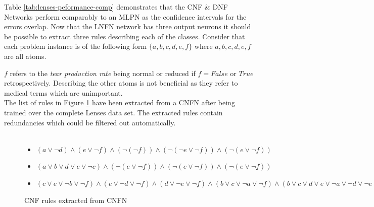 Table \ref{tab:lenses-peformance-comp} demonstrates that the CNF \& DNF Networks perform comparably to an MLPN as the confidence intervals for the errors overlap. Now that the LNFN network has three output neurons it should be possible to extract three rules describing each of the classes. Consider that each problem instance is of the following form $\{a, b, c, d, e, f\}$ where $a,b,c,d,e,f$ are all atoms.\\

\noindent
\begin{minipage}[t]{0.45\textwidth}
$f$ refers to the \textit{tear production rate} being normal or reduced if $f = False$ or $True$ retrospectively. Describing the other atoms is not beneficial as they refer to medical terms which are unimportant.\\

The list of rules in Figure \ref{fig:lenses-cnfn-rules} have been extracted from a CNFN after being trained over the complete Lenses data set. The extracted rules contain redundancies which could be filtered out automatically.\\ \\
\end{minipage}
\hspace{0.05\textwidth}
\begin{minipage}[t]{0.5\textwidth}
\begin{figure}[H]
	\begin{itemize}
		\item {} $(a \lor \lnot d) \land (e \lor \lnot f) \land (\lnot ( \lnot f )) \land (\lnot (\lnot e \lor \lnot f)) \land (\lnot(e \lor \lnot f))$
		\item {} $(a \lor b \lor d \lor e \lor \lnot c) \land (\lnot(e \lor \lnot f)) \land (\lnot(e \lor \lnot f)) \land (\lnot(e \lor \lnot f))$
		\item {} $(c \lor e \lor \lnot b \lor \lnot f) \land (e \lor \lnot d \lor \lnot f) \land (d \lor \lnot e \lor \lnot f) \land (b \lor c \lor \lnot a \lor \lnot f) \land (b \lor c \lor d \lor e \lor \lnot a \lor \lnot d \lor \lnot e \lor \lnot f) $
	\end{itemize}
	\caption{CNF rules extracted from CNFN}
	\label{fig:lenses-cnfn-rules}
\end{figure}
\end{minipage}


